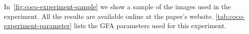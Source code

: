 \documentclass{siamart220329}
\begin{document}
%
%
In~\cref{fig:coco-experiment-sample} we show a sample of the images used in the
experiment. All the results are available online at the paper's website. 
\cref{tab:coco-experiment-parameter} lists the GFA parameters used for this
experiment.
%
%
\begin{figure}[t]
\center
{}


\end{figure}
\end{document}
